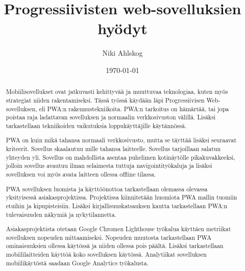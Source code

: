 \documentclass{tktltiki}
\begin{document}
\singlespacing

\title{Progressiivisten web-sovelluksien hyödyt}
\author{Niki Ahlskog}

\date{\today}

\maketitle






\begin{abstract}

Mobiilisovellukset ovat jatkuvasti kehittyvää ja muuttuvaa teknologiaa, kuten myös strategiat niiden rakentamiseksi. Tässä työssä käydään läpi Progressiivisen Web-sovelluksen, eli PWA:n rakennustekniikoita. PWA:n tarkoitus on hämärtää, tai jopa poistaa raja ladattavan sovelluksen ja normaalin verkkosivuston välillä. Lisäksi tarkastellaan tekniikoiden vaikutuksia loppukäyttäjille käytännössä.

PWA on kuin mikä tahansa normaali verkkosivusto, mutta se täyttää lisäksi seuraavat kriteerit. Sovellus skaalautuu mille tahansa laitteelle. Sovellus tarjoillaan salatun yhteyden yli. Sovellus on mahdollista asentaa puhelimen kotinäytölle pikakuvakkeeksi, jolloin sovellus avautuu ilman selaimesta tuttuja navigointityökaluja ja lisäksi sovelluksen voi myös avata laitteen ollessa offline tilassa. 

PWA sovelluksen luomista ja käyttöönottoa tarkastellaan olemassa olevassa yksityisessä asiakasprojektissa. Projektissa kiinnitetään huomiota PWA mallin tuomiin etuihin ja kipupisteisiin. Lisäksi kirjallisuuskatsauksen kautta tarkastellaan PWA:n tulevaisuuden näkymiä ja nykytilannetta. 

Asiakasprojektista otetaan Google Chromen Lighthouse työkalua käyttäen metriikat sovelluksen nopeuden mittaamiseksi. Nopeuden muutosta tarkastellaan PWA ominaisuuksien ollessa käytössä ja niiden ollessa pois päältä. Lisäksi tarkastellaan mobiililaitteiden käyttöä koko sovelluksen käytössä. Analytiikat sovelluksen mobiilikäytöstä saadaan Google Analytics työkalusta. \end{abstract}
\end{document}
